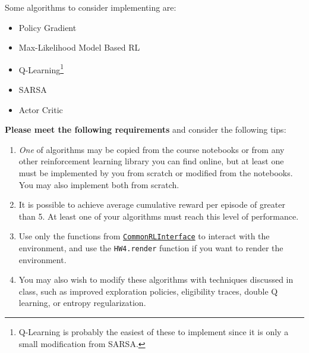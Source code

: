 \documentclass{article}
\theoremstyle{definition}
\begin{document}
Some algorithms to consider implementing are:
    \begin{itemize}[noitemsep]
        \item Policy Gradient
        \item Max-Likelihood Model Based RL
        \item Q-Learning\footnote{Q-Learning is probably the easiest of these to implement since it is only a small modification from SARSA.}
        \item SARSA
        \item Actor Critic
    \end{itemize}
    \textbf{Please meet the following requirements} and consider the following tips:
    \begin{enumerate}
        \item \emph{One} of algorithms may be copied from the course notebooks or from any other reinforcement learning library you can find online, but at least one must be implemented by you from scratch or modified from the notebooks. You may also implement both from scratch.
        \item It is possible to achieve average cumulative reward per episode of greater than 5. At least one of your algorithms must reach this level of performance.
        \item Use only the functions from \href{https://github.com/JuliaReinforcementLearning/CommonRLInterface.jl}{\texttt{CommonRLInterface}} to interact with the environment, and use the \texttt{HW4.render} function if you want to render the environment.
        \item You may also wish to modify these algorithms with techniques discussed in class, such as improved exploration policies, eligibility traces, double Q learning, or entropy regularization.
    \end{enumerate}
\end{document}
